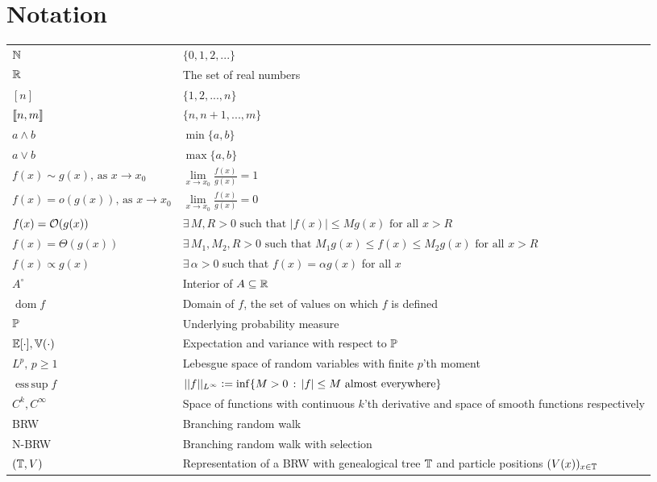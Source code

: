 \section*{Notation}
\begin{tabularx}{\linewidth}{ l X }
$\N$ 						& $\{0, 1, 2, ...\}$ \\
$\R$ 						& The set of real numbers \\
$[n]$ 					& $\{ 1, 2, ..., n\}$  \\
$\bbracket{n, m}$ 		& $\{n, n+1, ..., m\}$ \\
$a \land b$				& $\min\{ a, b\}$ \\
$a \lor b$				& $\max\{ a, b\}$ \\
$f(x) \sim g(x),\,\text{as }x\to x_0$   & $\lim\limits_{x \to x_0} \frac{f(x)}{g(x)} = 1$ \\
$f(x) = o(g(x)),\,\text{as }x\to x_0$   & $\lim\limits_{x \to x_0} \frac{f(x)}{g(x)} = 0$ \\
$f(x) = \cal{O}(g(x))$ & $\exists\,M, R > 0\text{ such that } |f(x)| \leq M g(x)\text{ for all } x > R$ \\
$f(x) = \Theta(g(x))$ & $\exists\,M_1, M_2, R > 0\text{ such that } M_1 g(x) \leq f(x) \leq M_2 g(x)\text{ for all } x > R$ \\
$f(x) \propto g(x)$	& $\exists\,\alpha > 0$ such that $f(x) = \alpha g(x)$ for all $x$ \\
$A^\circ$ & Interior of $A \subseteq \R$ \\
$\operatorname*{dom}f$ & Domain of $f$, the set of values on which $f$ is defined \\
$\P$ & Underlying probability measure \\
$\E[\cdot], \bb{V}(\cdot)$ & Expectation and variance with respect to $\P$ \\
$L^p,\,p\geq 1$     		& Lebesgue space of random variables with finite $p$'th moment \\
$\operatorname*{ess\,sup}f$ & $||f||_{L^\infty}\defeq\inf\{ M > 0\,:\, |f|\leq M\text{ almost everywhere}\}$ \\
$C^k, C^\infty$				& Space of functions with continuous $k$'th derivative and space of smooth functions respectively \\
BRW						& Branching random walk \\
N-BRW					& Branching random walk with selection \\
$(\bb{T}, V)$			& Representation of a BRW with genealogical tree $\bb{T}$ and particle positions $(V(x))_{x \in \bb{T}}$ \\

\end{tabularx}
